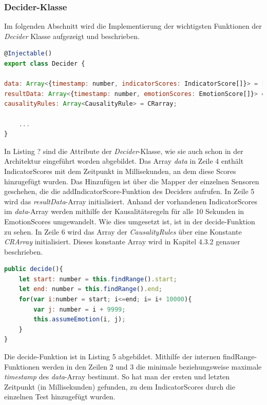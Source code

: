 \subsubsection{Decider-Klasse}
Im folgenden Abschnitt wird die Implementierung der wichtigsten Funktionen der \textit{Decider} Klasse aufgezeigt und beschrieben. \newline
\begin{lstlisting}[caption={Atrribute der Decider-Klasse}, language=JavaScript]
@Injectable()
export class Decider {

data: Array<{timestamp: number, indicatorScores: IndicatorScore[]}> = [];
resultData: Array<{timestamp: number, emotionScores: EmotionScore[]}> = [];
causalityRules: Array<CausalityRule> = CRarray;

	...
}
\end{lstlisting}
In Listing ? sind die Attribute der \textit{Decider}-Klasse, wie sie auch schon in der Architektur eingeführt worden abgebildet. Das Array \textit{data} in Zeile 4 enthält IndicatorScores mit dem Zeitpunkt in Millisekunden, an dem diese Scores hinzugefügt wurden. Das Hinzufügen ist über die Mapper der einzelnen Sensoren geschehen, die die addIndicatorScore-Funktion des Deciders aufrufen.\newline
In Zeile 5 wird das \textit{resultData}-Array initialisiert. Anhand der vorhandenen IndicatorScores im \textit{data}-Array werden mithilfe der Kausalitätsregeln für alle 10 Sekunden in EmotionScores umgewandelt. Wie dies umgesetzt ist, ist in der decide-Funktion zu sehen. \newline
In Zeile 6 wird das Array der \textit{CausalityRules} über eine Konstante \textit{CRArray} initialisiert. Dieses konstante Array wird in Kapitel 4.3.2 genauer beschrieben. \newline \newline
\begin{lstlisting}[caption={decide-Funktion der Decider-Klasse}, language=JavaScript]
public decide(){
	let start: number = this.findRange().start;
	let end: number = this.findRange().end;
	for(var i:number = start; i<=end; i= i+ 10000){
		var j: number = i + 9999;
		this.assumeEmotion(i, j);
	} 
}
\end{lstlisting}
Die decide-Funktion ist in Listing 5 abgebildet. Mithilfe der internen findRange-Funktionen werden in den Zeilen 2 und 3 die minimale beziehungsweise maximale \textit{timestamp} des \textit{data}-Array bestimmt. So hat man der ersten und letzten Zeitpunkt (in Millisekunden) gefunden, zu dem IndicatorScores durch die einzelnen Test hinzugefügt wurden. \newline

